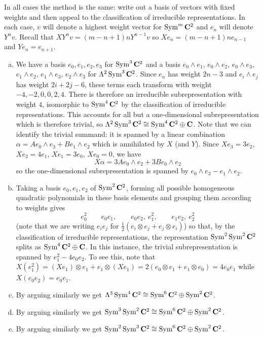 \documentclass[12pt]{article}
\begin{document}
\begin{answer}
In all cases the method is the same: write out a basis of vectors with fixed weights and then appeal to the classification of irreducible representations. In each case, $v$ will denote a highest weight vector for $\operatorname{Sym}^m\mathbf{C}^2$ and $e_n$ will denote $Y^nv$. Recall that $XY^nv=(m-n+1)nY^{n-1}v$ so $Xe_n=(m-n+1)ne_{n-1}$ and $Ye_n=e_{n+1}$.
\begin{enumerate}[(a)]
\item We have a basis $e_0,e_1,e_2,e_3$ for $\operatorname{Sym}^3\mathbf{C}^2$ and a basis $e_0\wedge e_1$, $e_0\wedge e_2$, $e_0\wedge e_3$, $e_1\wedge e_2$, $e_1\wedge e_3$, $e_2\wedge e_3$ for $\Lambda^2\operatorname{Sym}^3\mathbf{C}^2$. Since $e_n$ has weight $2n-3$ and $e_i\wedge e_j$ has weight $2i+2j-6$, these terms each transform with weight $-4,-2,0,0,2,4$. There is therefore an irreducible subrepresentation with weight $4$, isomorphic to $\operatorname{Sym}^4\mathbf{C}^2$ by the classification of irreducible representations. This accounts for all but a one-dimensional subrepresentation which is therefore trivial, so $\Lambda^2\operatorname{Sym}^3\mathbf{C}^2\cong\operatorname{Sym}^4\mathbf{C}^2\oplus\mathbf{C}$. Note that we can identify the trivial summand: it is spanned by a linear combination $\alpha=Ae_0\wedge e_3+Be_1\wedge e_2$ which is annihilated by $X$ (and $Y$). Since $Xe_3=3e_2$, $Xe_2=4e_1$, $Xe_1=3e_0$, $Xe_0=0$, we have
\[X\alpha=3Ae_0\wedge e_2+3Be_0\wedge e_2\]
so the one-dimensional subrepresentation is spanned by $e_0\wedge e_{3}-e_{1}\wedge e_2$.
\item Taking a basis $e_0,e_1,e_2$ of $\operatorname{Sym}^2\mathbf{C}^2$, forming all possible homogeneous quadratic polynomials in these basis elements and grouping them according to weights gives
\[e_0^2\qquad e_0e_1,\qquad e_0e_2,\ e_1^2,\qquad e_1e_2,\ e_2^2\]
(note that we are writing $e_ie_j$ for $\frac{1}{2}(e_i\otimes e_j+e_j\otimes e_i)$) so that, by the classification of irreducible representations, the representation $\operatorname{Sym}^2\operatorname{Sym}^2\mathbf{C}^2$ splits as $\operatorname{Sym}^4\mathbf{C}^2\oplus\mathbf{C}$. In this instance, the trivial subrepresentation is spanned by $e_1^2-4e_0e_2$. To see this, note that $X(e_1^2)=(Xe_1)\otimes e_1+e_1\otimes(Xe_1)=2(e_0\otimes e_1+e_1\otimes e_0)=4e_0e_1$ while $X(e_0e_2)=e_0e_1$.
\item By arguing similarly we get $\Lambda^3\operatorname{Sym}^4\mathbf{C}^2\cong\operatorname{Sym}^6\mathbf{C}^2\oplus\operatorname{Sym}^2\mathbf{C}^2$.
\item By arguing similarly we get $\operatorname{Sym}^3\operatorname{Sym}^2\mathbf{C}^2\cong\operatorname{Sym}^6\mathbf{C}^2\oplus\operatorname{Sym}^2\mathbf{C}^2$.
\item By arguing similarly we get $\operatorname{Sym}^2\operatorname{Sym}^3\mathbf{C}^2\cong\operatorname{Sym}^6\mathbf{C}^2\oplus\operatorname{Sym}^2\mathbf{C}^2$.

\end{enumerate}
\end{answer}
\end{document}
